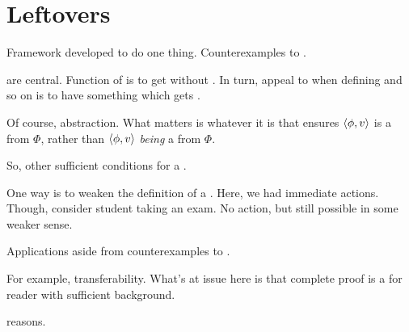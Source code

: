 
\chapter{Leftovers}
\label{cha:leftovers}



\begin{note}
  Framework developed to do one thing.
  Counterexamples to \issueInclusion{}.

   are central.
  Function of  is to get \ros{} without \wit{}.
  In turn, appeal to  when defining  and so on is to have something which gets \ros{}.

  Of course, abstraction.
  What matters is whatever it is that ensures \(\langle\phi, v\rangle\) is a \fc{} from \(\Phi\), rather than \(\langle\phi, v\rangle\) \emph{being} a \fc{} from \(\Phi\).
\end{note}

\begin{note}
  So, other sufficient conditions for a \ros{}.

  One way is to weaken the definition of a \fc{}.
  Here, we had immediate actions.
  Though, consider student taking an exam.
  No action, but still possible in some weaker sense.
\end{note}


\begin{note}
  Applications aside from counterexamples to \issueInclusion{}.

  For example, transferability.
  What's at issue here is that complete proof is a \fc{} for reader with sufficient background.
\end{note}


\begin{note}
   reasons.
\end{note}




